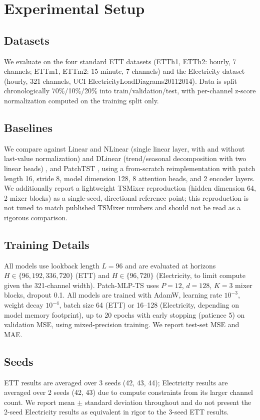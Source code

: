 \documentclass[conference]{IEEEtran}
\begin{document}
\section{Experimental Setup}

\subsection{Datasets}
We evaluate on the four standard ETT datasets (ETTh1, ETTh2: hourly, 7 channels;
ETTm1, ETTm2: 15-minute, 7 channels) \cite{zhou2021informer} and the Electricity
dataset (hourly, 321 channels, UCI ElectricityLoadDiagrams20112014). Data is split
chronologically 70\%/10\%/20\% into train/validation/test, with per-channel
z-score normalization computed on the training split only.

\subsection{Baselines}
We compare against Linear and NLinear (single linear layer, with and without
last-value normalization) and DLinear (trend/seasonal decomposition with two
linear heads) \cite{zeng2023transformers}, and PatchTST
\cite{nie2023patchtst}, using a from-scratch reimplementation with
patch length 16, stride 8, model dimension 128, 8 attention heads, and 2 encoder
layers. We additionally report a lightweight TSMixer \cite{chen2023tsmixer}
reproduction (hidden dimension 64, 2 mixer blocks) as a single-seed, directional
reference point; this reproduction is not tuned to match published TSMixer numbers
and should not be read as a rigorous comparison.

\subsection{Training Details}
All models use lookback length $L=96$ and are evaluated at horizons
$H \in \{96, 192, 336, 720\}$ (ETT) and $H \in \{96, 720\}$ (Electricity, to limit
compute given the 321-channel width). Patch-MLP-TS uses $P=12$, $d=128$, $K=3$
mixer blocks, dropout 0.1. All models are trained with AdamW, learning rate
$10^{-3}$, weight decay $10^{-4}$, batch size 64 (ETT) or 16--128 (Electricity,
depending on model memory footprint), up to 20 epochs with early stopping
(patience 5) on validation MSE, using mixed-precision training. We report test-set
MSE and MAE.

\subsection{Seeds}
ETT results are averaged over 3 seeds (42, 43, 44); Electricity results are
averaged over 2 seeds (42, 43) due to compute constraints from its larger channel
count. We report mean $\pm$ standard deviation throughout and do not present the
2-seed Electricity results as equivalent in rigor to the 3-seed ETT results.
\end{document}
